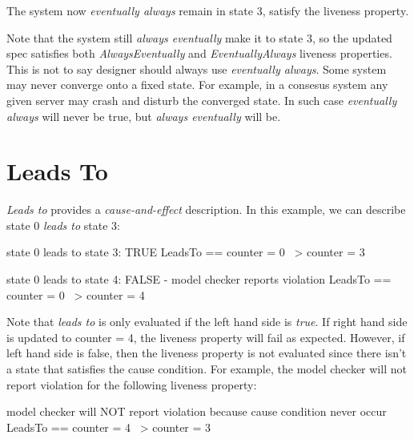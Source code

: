 The system now \textit{eventually always} remain in state 3, satisfy the 
liveness property.\newline 

Note that the system still \textit{always eventually} make it to state 3, so the
updated spec satisfies both \textit{AlwaysEventually} and
\textit{EventuallyAlways} liveness properties. This is not to say designer
should always use \textit{eventually always}. Some system may never converge 
onto a fixed state. For example, in a consesus system any given server may crash
and disturb the converged state. In such case \textit{eventually always} will 
never be true, but \textit{always eventually} will be.

\section{Leads To}

\textit{Leads to} provides a \textit{cause-and-effect} description. In this example, 
we can describe state 0 \textit{leads to} state 3:\newline
\begin{tla}
    \* state 0 leads to state 3: TRUE 
    LeadsTo == counter = 0 ~> counter = 3

    \* state 0 leads to state 4: FALSE - model checker reports violation
    LeadsTo == counter = 0 ~> counter = 4
\end{tla}
\begin{tlatex}
%
%
\@xx{}%
\@pvspace{8.0pt}%
%
%
\@xx{}%
\end{tlatex}
\newline

Note that \textit{leads to} is only evaluated if the left hand side is
\textit{true}. If right hand side is updated to counter = 4, the liveness
property will fail as expected. However, if left hand side is false, then the
liveness property is not evaluated since there isn't a state that satisfies the
cause condition. For example, the model checker will not report violation for
the following liveness property:\newline
\begin{tla}
    \* model checker will NOT report violation because cause condition never occur 
    LeadsTo == counter = 4 ~> counter = 3
\end{tla}
\begin{tlatex}
%
%
\@xx{}%
\end{tlatex}

% 
